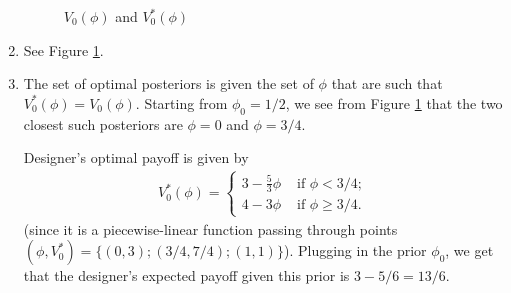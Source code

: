 \documentclass[a4paper]{article}
\begin{document}
\begin{enumerate}
\begin{figure}
{
				\caption{$V_0(\phi)$ and $V_0^*(\phi)$}
				\label{fig:twoappr_v0}
			}
		\end{figure}
	
		\item See Figure \ref{fig:twoappr_v0}.
		
		\item The set of optimal posteriors is given the set of $\phi$ that are such that $V_0^*(\phi) = V_0(\phi)$. Starting from $\phi_0=1/2$, we see from Figure \ref{fig:twoappr_v0} that the two closest such posteriors are $\phi=0$ and $\phi=3/4$. 
		
		Designer's optimal payoff is given by
		\begin{align*}
		V_0^*(\phi) = \begin{cases}
			3-\frac{5}{3}\phi & \text{ if } \phi < 3/4;
			\\
			4-3\phi & \text{ if } \phi \geq 3/4.
		\end{cases}
		\end{align*}
		(since it is a piecewise-linear function passing through points $(\phi,V_0^*) = \{(0,3);(3/4,7/4);(1,1)\}$). Plugging in the prior $\phi_0$, we get that the designer's expected payoff given this prior is $3-5/6 = 13/6$.
		

\end{enumerate}
\end{document}
